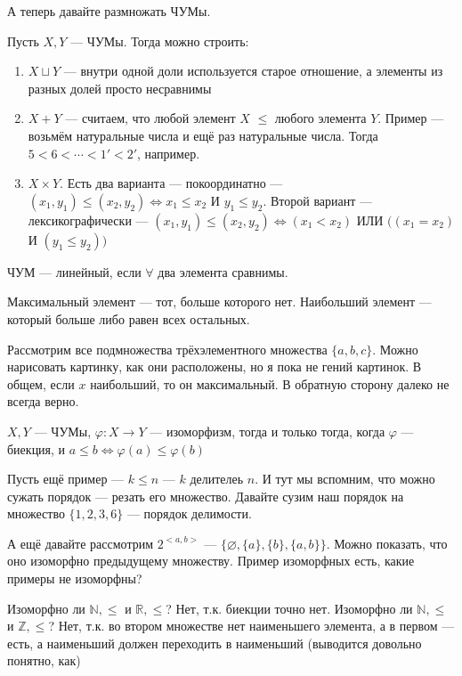 А теперь давайте размножать ЧУМы. 

Пусть $X, Y$ --- ЧУМы. Тогда можно строить:

\begin{enumerate}
	\item{$X \sqcup Y$ --- внутри одной доли используется старое отношение, а элементы из разных долей просто несравнимы}
	\item{$X + Y$ --- считаем, что любой элемент $X$ $\le$ любого элемента $Y$. Пример --- возьмём натуральные числа и ещё раз натуральные числа. Тогда $5 < 6 < \cdots < 1' < 2'$, например.}
	\item{$X \times Y$. Есть два варианта --- покоординатно --- $(x_1, y_1) \le (x_2, y_2) \Leftrightarrow x_1 \le x_2 $ И $y_1 \le y_2$. Второй вариант --- лексикографически --- $(x_1, y_1) \le (x_2, y_2) \Leftrightarrow (x_1 < x_2)$ ИЛИ $((x_1 = x_2)$ И $ (y_1 \le y_2))$ }
\end{enumerate}

\begin{definition}
	ЧУМ --- линейный, если $\forall$ два элемента сравнимы. 
\end{definition}

\begin{definition}
Максимальный элемент --- тот, больше которого нет. Наибольший элемент --- который больше либо равен всех остальных. 
\end{definition}

Рассмотрим все подмножества трёхэлементного множества $\{a, b, c\}$. Можно нарисовать картинку, как они расположены, но я пока не гений картинок. В общем, если $x$ наибольший, то он максимальный. В обратную сторону далеко не всегда верно.

\begin{definition}
	$X, Y$ --- ЧУМы, $\varphi: X \to Y$ --- изоморфизм, тогда и только тогда, когда $\varphi$ --- биекция, и $a \le b \Leftrightarrow \varphi(a) \le \varphi(b)$
\end{definition}

Пусть ещё пример --- $k \le n$ --- $k$ делителеь $n$. И тут мы вспомним, что можно сужать порядок --- резать его множество. Давайте сузим наш порядок на множество $\{1, 2, 3, 6\}$ --- порядок делимости.

А ещё давайте рассмотрим $2^{<a, b>}$ --- $\{\varnothing, \{a\}, \{b\}, \{a, b\}\}$. Можно показать, что оно изоморфно предыдущему множеству. Пример изоморфных есть, какие примеры не изоморфны?

Изоморфно ли $\mathbb{N}, \le$ и $\mathbb{R}, \le$? Нет, т.к. биекции точно нет.
Изоморфно ли $\mathbb{N}, \le$ и $\mathbb{Z}, \le$? Нет, т.к. во втором множестве нет наименьшего элемента, а в первом --- есть, а наименьший должен переходить в наименьший (выводится довольно понятно, как) 

